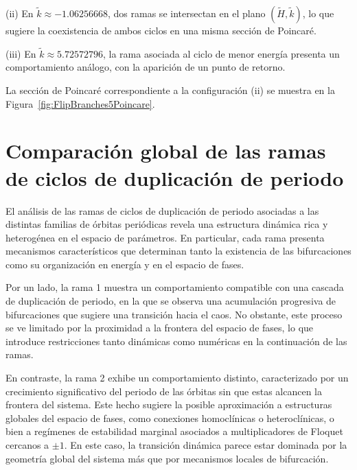 (ii) En $\tilde{k} \approx -1.06256668$, dos ramas se intersectan en el plano $(\tilde{H}, \tilde{k})$, lo que sugiere la coexistencia de ambos ciclos en una misma sección de Poincaré.

(iii) En $\tilde{k} \approx 5.72572796$, la rama asociada al ciclo de menor energía presenta un comportamiento análogo, con la aparición de un punto de retorno.

La sección de Poincaré correspondiente a la configuración (ii) se muestra en la Figura~\ref{fig:FlipBranches5Poincare}.


\section{Comparación global de las ramas de ciclos de duplicación de periodo}

El análisis de las ramas de ciclos de duplicación de periodo asociadas a las distintas familias de órbitas periódicas revela una estructura dinámica rica y heterogénea en el espacio de parámetros. En particular, cada rama presenta mecanismos característicos que determinan tanto la existencia de las bifurcaciones como su organización en energía y en el espacio de fases.

Por un lado, la rama 1 muestra un comportamiento compatible con una cascada de duplicación de periodo, en la que se observa una acumulación progresiva de bifurcaciones que sugiere una transición hacia el caos. No obstante, este proceso se ve limitado por la proximidad a la frontera del espacio de fases, lo que introduce restricciones tanto dinámicas como numéricas en la continuación de las ramas.

En contraste, la rama 2 exhibe un comportamiento distinto, caracterizado por un crecimiento significativo del periodo de las órbitas sin que estas alcancen la frontera del sistema. Este hecho sugiere la posible aproximación a estructuras globales del espacio de fases, como conexiones homoclínicas o heteroclínicas, o bien a regímenes de estabilidad marginal asociados a multiplicadores de Floquet cercanos a $\pm 1$. En este caso, la transición dinámica parece estar dominada por la geometría global del sistema más que por mecanismos locales de bifurcación.

